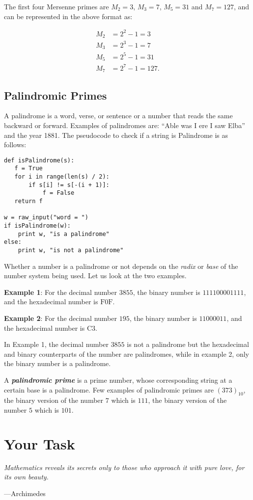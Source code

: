 \documentclass[11pt,twocolumn]{article}
\begin{document}
The first four Mersenne primes are $M_{2} = 3$, $M_{3} = 7$, $M_{5}
= 31$ and $M_{7} = 127$, and can be represented in the above format
as:

\begin{align*}
M_{2} & = 2^{2} - 1= 3 \\
M_{3} & = 2^{3} - 1= 7 \\
M_{5} & = 2^{5} - 1= 31 \\
M_{7} & = 2^{7} - 1= 127.
\end{align*}

\subsection{Palindromic Primes}
A palindrome is a word, verse, or sentence or a number that reads
the same backward or forward. Examples of palindromes are: ``Able
was I ere I saw Elba'' and the year 1881. The pseudocode to check if a
string is Palindrome is as follows:

\begin{lstlisting}[style = stylePython]
def isPalindrome(s):
   f = True
   for i in range(len(s) / 2):
       if s[i] != s[-(i + 1)]:
           f = False
   return f

w = raw_input("word = ")
if isPalindrome(w):
    print w, "is a palindrome"
else:
    print w, "is not a palindrome"
\end{lstlisting}

Whether a number is a palindrome or not depends on the \emph{radix}
or \emph{base} of the number system being used. Let us look at the
two examples.

\textbf{Example 1}: For the decimal number $3855$, the binary number is $111100001111$, and the hexadecimal number is $\text{F0F}$.

\textbf{Example 2}: For the decimal number $195$, the binary number is $11000011$, and the hexadecimal number is $\text{C}3$.

In Example 1, the decimal number $3855$ is not a palindrome but the hexadecimal and binary counterparts of the number are palindromes, while in example 2, only the binary number is a palindrome.

A \textbf{\textit{palindromic prime}} is a prime number, whose
corresponding string at a certain base is a palindrome. Few examples
of palindromic primes are $(373)_{10}$, the binary version of the
number $7$ which is $111$, the binary version of the number $5$
which is $101$.

\section{Your Task}
\epigraph{\emph{Mathematics reveals its secrets only to those who approach it
with pure love, for its own beauty.}}{---Archimedes}
\end{document}
